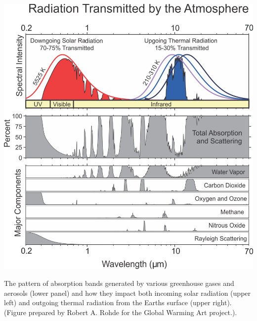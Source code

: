 \documentclass{tufte-book} %
\begin{document}
\begin{marginfigure}[-2.25in]
\includegraphics[width=\linewidth]{ridgwell-and-valdes-Figures.png}
\caption{The pattern of absorption bands generated by various greenhouse gases and aerosols (lower panel) and how they impact both incoming solar radiation (upper left) and outgoing thermal radiation from the Earths surface (upper right). (Figure prepared by Robert A. Rohde for the Global Warming Art project.).}
\label{fig:ch8-blackbody}
\end{marginfigure}
\end{document}
